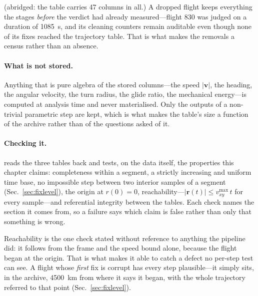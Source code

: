 \begin{revblock}
\noindent (abridged: the table carries \num{47} columns in all.) A dropped flight
keeps everything the stages \emph{before} the verdict had already measured---flight 830
was judged on a duration of \SI{1085}{\second}, and its cleaning counters remain
auditable even though none of its fixes reached the trajectory table. That is what makes
the removals a census rather than an absence.

\paragraph{What is not stored.} Anything that is pure algebra of the stored columns---the
speed $|\mathbf{v}|$, the heading, the angular velocity, the turn radius, the glide ratio,
the mechanical energy---is computed at analysis time and never materialised. Only the
outputs of a non-trivial parametric step are kept, which is what makes the table's size a
function of the archive rather than of the questions asked of it.

\paragraph{Checking it.}\label{impl:verify}  reads the
three tables back and tests, on the data itself, the properties this chapter claims:
completeness within a segment, a strictly increasing and uniform time base, no impossible
step between two interior samples of a segment (Sec.~\ref{sec:fixlevel}), the origin at
$r(0)=0$, reachability---$|\mathbf{r}(t)|\le v_{xy}^{\max}\,t$ for every sample---and
referential integrity between the tables. Each check names the section it comes from, so
a failure says which claim is false rather than only that something is wrong.

Reachability is the one check stated without reference to anything the pipeline did: it
follows from the frame and the speed bound alone, because the flight began at the origin.
That is what makes it able to catch a defect no per-step test can see. A flight whose
\emph{first} fix is corrupt has every step plausible---it simply sits, in the archive,
\SI{4500}{\kilo\metre} from where it says it began, with the whole trajectory referred to
that point (Sec.~\ref{sec:fixlevel}).


\end{revblock}
